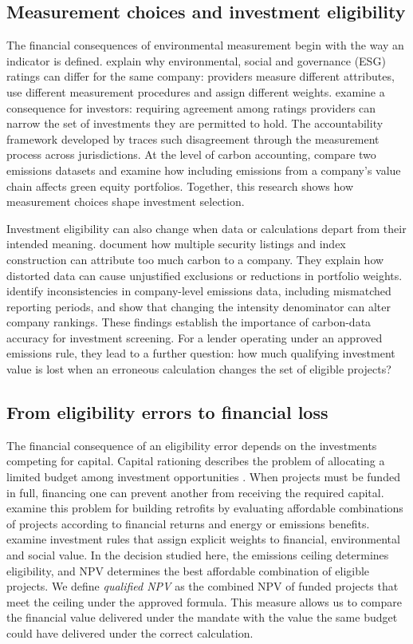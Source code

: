 \subsection{Measurement choices and investment eligibility}
The financial consequences of environmental measurement begin with the way an indicator is defined. \citet{berg} explain why environmental, social and governance (ESG) ratings can differ for the same company: providers measure different attributes, use different measurement procedures and assign different weights. \citet{lohmann} examine a consequence for investors: requiring agreement among ratings providers can narrow the set of investments they are permitted to hold. The accountability framework developed by \citet{tian2026} traces such disagreement through the measurement process across jurisdictions. At the level of carbon accounting, \citet{anquetin} compare two emissions datasets and examine how including emissions from a company's value chain affects green equity portfolios. Together, this research shows how measurement choices shape investment selection.

Investment eligibility can also change when data or calculations depart from their intended meaning. \citet{gurvich2021} document how multiple security listings and index construction can attribute too much carbon to a company. They explain how distorted data can cause unjustified exclusions or reductions in portfolio weights. \citet{bajic2023} identify inconsistencies in company-level emissions data, including mismatched reporting periods, and show that changing the intensity denominator can alter company rankings. These findings establish the importance of carbon-data accuracy for investment screening. For a lender operating under an approved emissions rule, they lead to a further question: how much qualifying investment value is lost when an erroneous calculation changes the set of eligible projects?

\subsection{From eligibility errors to financial loss}
The financial consequence of an eligibility error depends on the investments competing for capital. Capital rationing describes the problem of allocating a limited budget among investment opportunities \citep{lorie}. When projects must be funded in full, financing one can prevent another from receiving the required capital. \citet{he} examine this problem for building retrofits by evaluating affordable combinations of projects according to financial returns and energy or emissions benefits. \citet{schoenmaker} examine investment rules that assign explicit weights to financial, environmental and social value. In the decision studied here, the emissions ceiling determines eligibility, and NPV determines the best affordable combination of eligible projects. We define \emph{qualified NPV} as the combined NPV of funded projects that meet the ceiling under the approved formula. This measure allows us to compare the financial value delivered under the mandate with the value the same budget could have delivered under the correct calculation.

